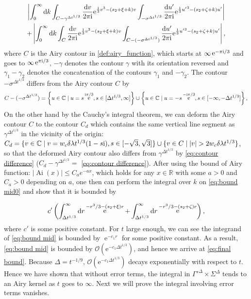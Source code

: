 \documentclass[cmp]{svjour}
\numberwithin{theorem}{section}
\numberwithin{equation}{section}
\DeclareMathOperator{\e}{e}
\DeclareMathOperator{\Ai}{Ai}
\def\dd{{\rm d}}
\def\ii{{\rm i}}
\def\i{{\infty}}
\begin{document}
\begin{multline}
\left| \int_{0}^{\infty} \mathrm{d} k \int_{C - \gamma^{\Delta t^{1/3}}} \frac{\mathrm{d} v}{2 \pi \ii} \mathrm{e}^{  \frac{1}{3} v^3 - (s_2 + \xi + k) v}  \int_{ - \sigma^{\Delta t^{1/3}}} \frac{\mathrm{d} u'}{2 \pi \ii} \mathrm{e}^{ \frac{1}{3} {u'}^3 - (s_2 + \zeta + k) u'} \right| \\ 
+ \left| \int_{0}^{\infty} \mathrm{d} k \int_{C} \frac{\mathrm{d} v}{2 \pi \ii} \mathrm{e}^{  \frac{1}{3} v^3 - (s_2 + \xi + k) v}  \int_{ C - ( - \sigma^{\Delta t^{1/3}})} \frac{\mathrm{d} u'}{2 \pi \ii} \mathrm{e}^{ \frac{1}{3} {u'}^3 - (s_2 + \zeta + k) u'} \right|,
\label{eq:bound mid0}
\end{multline}
where $C$ is the Airy contour in \eqref{def:airy_function}, which starts at $\infty \e^{- \pi \ii / 3}$ and goes to $\infty \e^{\pi \ii /3}$, $-\gamma$ denotes the contour $\gamma$ with its orientation reversed and $\gamma_1 - \gamma_2$ denotes the concatenation of the contours $\gamma_1$ and $-\gamma_2$.
The contour $-\sigma^{\Delta t^{1/3}}$ differs from the Airy contour $C$ by 
\begin{equation}
\label{eq:contour difference}
C - (- \sigma^{\Delta t^{1/3}})=  \left\{ 
u\in \mathbb{C} \mid u=s\e^{ \ii \pi /3} , s\in [\Delta t^{1/3} ,\i] \right\} \cup \left\{ u\in \mathbb{C} \mid u=-s\e^{- \ii \pi /3} , s\in [-\i, - \Delta t^{1/3}] \right\},
\end{equation}
On the other hand by the Cauchy's integral theorem, we can deform the Airy contour $C$ to the contour $C_d$ which contains the same vertical line segment as $\gamma^{\Delta t^{1/3}}$ in the vicinity of the origin: $C_{d}=\{ v \in \mathbb{C} \mid v = w_c\delta\lambda t^{1/3}(1-s \ii),s\in [-\sqrt{3},\sqrt{3}]\}\cup\{v \in C \mid |v| > 2w_c\delta\lambda t^{1/3} \}$, so that the deformed Airy contour also differs from $\gamma^{\Delta t^{1/3}}$ by  \eqref{eq:contour difference} ($C_d - \gamma^{\Delta t^{1/3}}=$  \eqref{eq:contour difference}). 
After using the bound of Airy function: $|\Ai(x)| \leq C_a e^{-ax}$, which holds for any $x \in \mathbb{R}$ with some $a>0$ and $C_a>0$ depending on $a$, one then can perform the integral over $k$ on \eqref{eq:bound mid0} and show that it is bounded by 

\begin{align}
	\label{eq:bound mid}
c' \left(\int_{\Delta t^{1/3}}^{\i} \dd r \e^{-r^3/3-(s_2+\xi)r} + \int_{\Delta t^{1/3}}^{\i} \dd r \e^{-r^3/3-(s_2+\zeta)r}\right),
\end{align}
where $c'$ is some positive constant. For $t$ large enough, we can see the integrand of \eqref{eq:bound mid} is bounded by $\e^{-c_1 r}$ for some positive constant.  As a result, \eqref{eq:bound mid} is bounded by $\mathcal{O}( \mathrm{e}^{ - c_1 \Delta t^{1/3} } )$, and hence we arrive at \eqref{eq:final bound}. Because $\Delta=t^{-1/9}$, $\mathcal{O}( \mathrm{e}^{ - c_1 \Delta t^{1/3} } )$ decays exponentially with respect to $t$. Hence we have shown that without error terms, the integral in $\Gamma'^{\Delta} \times \Sigma^{\Delta}$ tends to an Airy kernel as $t$ goes to $\i$. Next we will prove the integral involving error terms vanishes.
\end{document}
